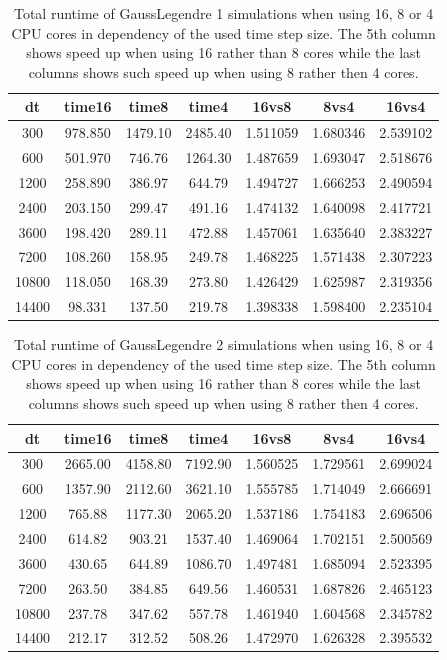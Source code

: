 \documentclass[a4paper, 12pt]{article}
\begin{document}
\begin{table}[h]\centering
\begin{tabular}{c|c|c|c|c|c|c}
dt &  time16  &  time8  & time4  &   16vs8       &   8vs4   & 16vs4 \\\hline
 300 & 978.850 & 1479.10 & 2485.40 & 1.511059    & 1.680346 & 2.539102\\
    600 & 501.970  & 746.76 & 1264.30 & 1.487659 & 1.693047 & 2.518676\\
   1200 & 258.890  & 386.97  & 644.79 & 1.494727 & 1.666253 & 2.490594\\
   2400 & 203.150  & 299.47  & 491.16 & 1.474132 & 1.640098 & 2.417721\\
   3600 & 198.420 &  289.11 &  472.88 & 1.457061 & 1.635640 & 2.383227\\
   7200 & 108.260  & 158.95  & 249.78 & 1.468225 & 1.571438 & 2.307223\\
  10800 & 118.050 &  168.39  & 273.80 & 1.426429 & 1.625987 & 2.319356\\
  14400 &  98.331 &  137.50 &  219.78 & 1.398338 & 1.598400 & 2.235104\\
\end{tabular}
\caption{Total runtime of GaussLegendre 1 simulations when using 16, 8 or 4 CPU cores in dependency of the used time step size. The 5th column shows speed up when using 16 rather than 8 cores while the last columns shows such speed up when using 8 rather then 4 cores.}
\label{tab_irksgl1_cores}
\end{table}




\begin{table}[h]\centering
\begin{tabular}{c|c|c|c|c|c|c}
dt &  time16  &  time8  & time4  &   16vs8   &   8vs4  & 16vs4    \\\hline
     300  & 2665.00  & 4158.80  & 7192.90  & 1.560525  & 1.729561 & 2.699024\\
     600  & 1357.90  & 2112.60  & 3621.10  & 1.555785  & 1.714049  & 2.666691 \\
    1200  &  765.88  & 1177.30  & 2065.20  & 1.537186  & 1.754183  & 2.696506\\
    2400  &  614.82   & 903.21  & 1537.40  & 1.469064  & 1.702151  & 2.500569\\
   3600   & 430.65   & 644.89   &1086.70  & 1.497481  & 1.685094  & 2.523395\\
   7200  &  263.50   & 384.85   & 649.56   &1.460531  & 1.687826  & 2.465123\\
  10800   & 237.78   & 347.62   & 557.78  & 1.461940  & 1.604568  & 2.345782 \\
  14400   & 212.17   & 312.52   & 508.26  & 1.472970  & 1.626328  & 2.395532
\end{tabular}
\caption{Total runtime of GaussLegendre 2 simulations when using 16, 8 or 4 CPU cores in dependency of the used time step size. The 5th column shows speed up when using 16 rather than 8 cores while the last columns shows such speed up when using 8 rather then 4 cores.}
\label{tab_irksgl2_cores}
\end{table}
\end{document}

